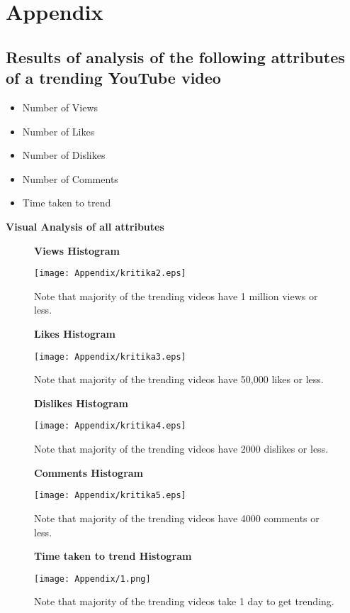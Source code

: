 \documentclass[runningheads]{llncs}
\begin{document}
\newpage
\section{Appendix}
\subsection{Results of analysis of the following attributes of a trending YouTube video}
\begin{itemize}
  \item Number of Views 
  \item Number of Likes
  \item Number of Dislikes
  \item Number of Comments
  \item Time taken to trend
\end{itemize}
\textbf{ Visual Analysis of all attributes}
\begin{figure}[H]
\centering
\begin{minipage}{.5\textwidth}
  \centering
  \textbf{Views Histogram}\par\medskip
  \texttt{[image: Appendix/kritika2.eps]}
  \caption{Note that majority of the trending videos have 1 million views or less.}
\end{minipage}%
\begin{minipage}{.5\textwidth}
  \centering
  \textbf{Likes Histogram}\par\medskip
  \texttt{[image: Appendix/kritika3.eps]}
  \caption{Note that majority of the trending videos have 50,000 likes or less.}
\end{minipage}
\end{figure}
\begin{figure}[H]
\centering
\begin{minipage}{.5\textwidth}
  \centering
  \textbf{Dislikes Histogram}\par\medskip
  \texttt{[image: Appendix/kritika4.eps]}
  \caption{Note that majority of the trending videos have 2000 dislikes or less.} 
\end{minipage}%
\begin{minipage}{.5\textwidth}
  \centering
  \textbf{Comments Histogram}\par\medskip
   \texttt{[image: Appendix/kritika5.eps]}
  \caption{Note that majority of the trending videos have 4000 comments or less.} 
\end{minipage}
\end{figure}
\begin{figure}[H]
\centering
\begin{minipage}{.5\textwidth}
  \textbf{Time taken to trend Histogram}\par\medskip
  \texttt{[image: Appendix/1.png]}
  \caption{Note that majority of the trending videos take 1 day to get trending.}
\end{minipage}
\end{figure}
\end{document}
